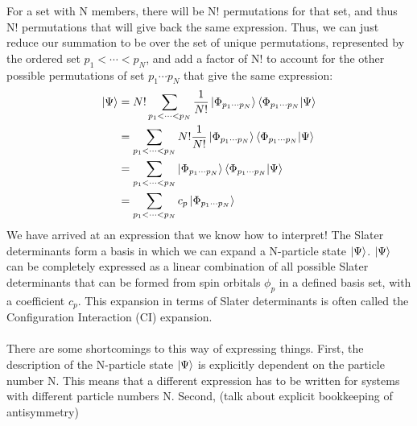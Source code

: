 \documentclass{article}
\begin{document}
For a set with N members, there will be N! permutations for that set, and thus N! permutations that will give back the same expression.
Thus, we can just reduce our summation to be over the set of unique permutations, represented by the ordered set $p_1 < \cdots < p_N$, and add a factor of N! to account for the 
other possible permutations of set $p_1 \cdots p_N$ that give the same expression: 
\begin{align*}
\ket{\Psi} &=N! \sum_{p_1 < \cdots < p_N}  \frac{1}{N!} \ket{\Phi_{p_1 \cdots p_N}}\braket{\Phi_{p_1 \cdots p_N} | \Psi}   \\
&=  \sum_{p_1 < \cdots < p_N} N! \frac{1}{N!} \ket{\Phi_{p_1 \cdots p_N}}\braket{\Phi_{p_1 \cdots p_N} | \Psi}   \\
&=  \sum_{p_1 < \cdots < p_N} \ket{\Phi_{p_1 \cdots p_N}}\braket{\Phi_{p_1 \cdots p_N} | \Psi}   \\
&=  \sum_{p_1 < \cdots < p_N} c_p \ket{\Phi_{p_1 \cdots p_N}} \\
\end{align*}
We have arrived at an expression that we know how to interpret! 
The Slater determinants form a basis in which we can expand a N-particle state $\ket{\Psi}$. 
$\ket{\Psi}$ can be completely expressed as a linear combination of all possible Slater determinants that can be formed from spin orbitals $\phi_p$ in a defined basis set, with a coefficient $c_p$. 
This expansion in terms of Slater determinants is often called the Configuration Interaction (CI) expansion.
\\ \\
There are some shortcomings to this way of expressing things. 
First, the description of the N-particle state $\ket{\Psi}$ is explicitly dependent on the particle number N. 
This means that a different expression has to be written for systems with different particle numbers N. 
Second, (talk about explicit bookkeeping of antisymmetry)
\end{document}
